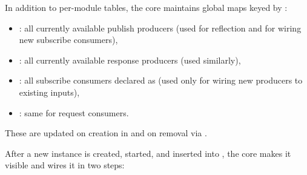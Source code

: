 
In addition to per-module tables, the core maintains global maps keyed by :
\begin{itemize}
    \item {}: all currently available publish producers (used for reflection and for wiring new  subscribe consumers),
    \item {}: all currently available response producers (used similarly),
    \item {}: all subscribe consumers declared as  (used only for wiring new producers to existing  inputs),
    \item {}: same for request consumers.
\end{itemize}
These are updated on creation in  and on removal via .

After a new instance is created, started, and inserted into , the core makes it visible and wires it in two steps:

